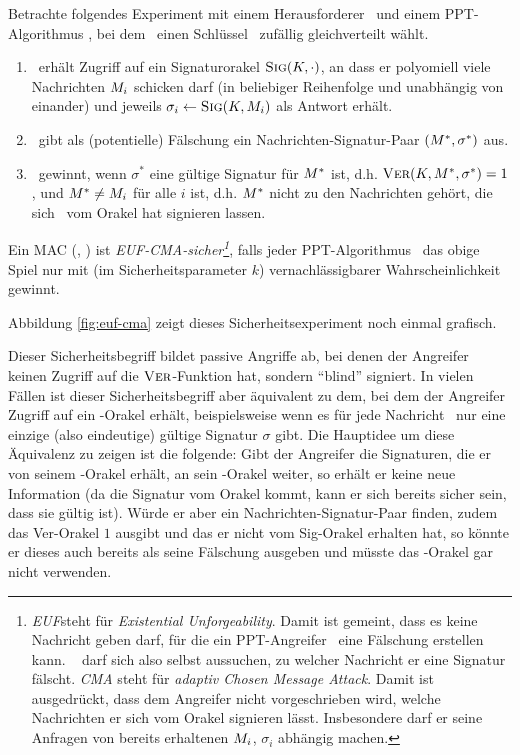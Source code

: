 \begin{definition} Betrachte folgendes Experiment mit einem
  Herausforderer \C~und einem PPT-Algorithmus \A, bei dem \C~einen
  Schlüssel \key~zufällig gleichverteilt wählt.
  \begin{enumerate}
  \item \A~erhält Zugriff auf ein Signaturorakel $\textsc{Sig}(K,\cdot)$, an
    dass er polyomiell viele Nachrichten $M_i$ schicken darf (in
    beliebiger Reihenfolge und unabhängig von einander) und jeweils
    $\sigma_i \leftarrow \textsc{Sig}(K, M_i)$ als Antwort erhält.
  \item \A~gibt als (potentielle) Fälschung ein Nachrichten-Signatur-Paar
    $(M^*,\sigma^*)$ aus.
  \item \A~gewinnt, wenn $\sigma^*$ eine gültige Signatur für $M^*$
    ist, d.h. $\textsc{Ver}(K, M^*, \sigma^*)=1$, und $M^* \neq
    M_i$ für alle $i$ ist, d.h. $M^*$ nicht zu den Nachrichten
    gehört, die sich \A~vom Orakel hat signieren lassen.
  \end{enumerate}
\end{definition}

Ein MAC (\sig, \ver) ist \textit{EUF-CMA-sicher\footnote{\textit{EUF}\indexEUFCMA steht für \textit{Existential Unforgeability}. Damit ist
    gemeint, dass es keine Nachricht geben darf, für die ein PPT-Angreifer
    \A~eine Fälschung erstellen kann. \A~ darf sich also selbst aussuchen,
    zu welcher Nachricht er eine Signatur fälscht. \textit{CMA} steht für
    \textit{adaptiv Chosen Message Attack}. Damit ist ausgedrückt, dass dem
    Angreifer nicht vorgeschrieben wird, welche Nachrichten er sich vom
    Orakel signieren lässt. Insbesondere darf er seine Anfragen von bereits
    erhaltenen $M_i$, $\sigma_i$ abhängig machen.}}, falls jeder
PPT-Algorithmus \A~das obige Spiel nur mit (im Sicherheitsparameter $k$)
vernachlässigbarer Wahrscheinlichkeit gewinnt.

Abbildung \ref{fig:euf-cma} zeigt dieses Sicherheitsexperiment noch
einmal grafisch.

Dieser Sicherheitsbegriff bildet passive Angriffe ab, bei denen der
Angreifer keinen Zugriff auf die $\textsc{Ver}$-Funktion hat, sondern "`blind"'
signiert. In vielen Fällen ist dieser Sicherheitsbegriff aber äquivalent
zu dem, bei dem der Angreifer Zugriff auf ein \ver-Orakel erhält,
beispielsweise wenn es für jede Nachricht \plaint~nur eine einzige (also
eindeutige) gültige Signatur $\sigma$ gibt. Die Hauptidee um diese
Äquivalenz zu zeigen ist die folgende: Gibt der Angreifer die
Signaturen, die er von seinem \sig-Orakel erhält, an sein \ver-Orakel
weiter, so erhält er keine neue Information (da die Signatur vom Orakel
kommt, kann er sich bereits sicher sein, dass sie gültig ist). Würde er
aber ein Nachrichten-Signatur-Paar finden, zudem das Ver-Orakel $1$
ausgibt und das er nicht vom Sig-Orakel erhalten hat, so könnte er
dieses auch bereits als seine Fälschung ausgeben und müsste das
\ver-Orakel gar nicht verwenden.

